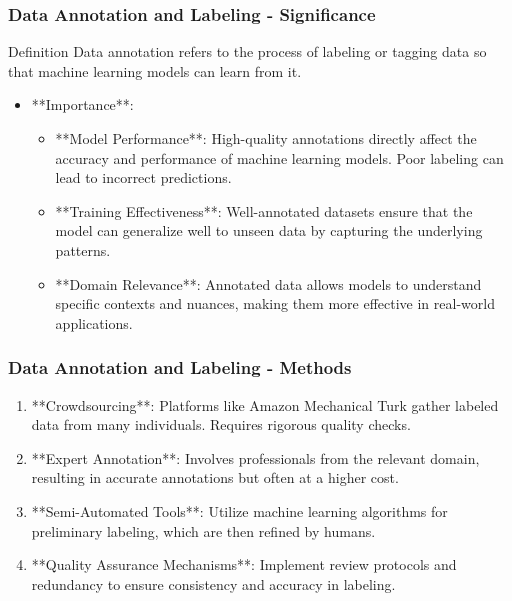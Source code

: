 \documentclass[aspectratio=169]{beamer}
\begin{document}
\begin{frame}[fragile]
    \frametitle{Data Annotation and Labeling - Significance}
    \begin{block}{Definition}
        Data annotation refers to the process of labeling or tagging data so that machine learning models can learn from it.
    \end{block}
    \begin{itemize}
        \item **Importance**:
        \begin{itemize}
            \item **Model Performance**: High-quality annotations directly affect the accuracy and performance of machine learning models. Poor labeling can lead to incorrect predictions.
            \item **Training Effectiveness**: Well-annotated datasets ensure that the model can generalize well to unseen data by capturing the underlying patterns.
            \item **Domain Relevance**: Annotated data allows models to understand specific contexts and nuances, making them more effective in real-world applications.
        \end{itemize}
    \end{itemize}
\end{frame}

\begin{frame}[fragile]
    \frametitle{Data Annotation and Labeling - Methods}
    \begin{enumerate}
        \item **Crowdsourcing**: Platforms like Amazon Mechanical Turk gather labeled data from many individuals. Requires rigorous quality checks.
        \item **Expert Annotation**: Involves professionals from the relevant domain, resulting in accurate annotations but often at a higher cost.
        \item **Semi-Automated Tools**: Utilize machine learning algorithms for preliminary labeling, which are then refined by humans.
        \item **Quality Assurance Mechanisms**: Implement review protocols and redundancy to ensure consistency and accuracy in labeling.
    \end{enumerate}
\end{frame}
\end{document}
